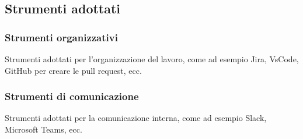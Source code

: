 \subsection{Strumenti adottati}
\label{sez:strumenti-adottati}

\subsubsection{Strumenti organizzativi}
\label{sez:strumenti-organizzativi}

Strumenti adottati per l'organizzazione del lavoro, come ad esempio Jira, VsCode, GitHub per creare le pull request, ecc.

\subsubsection{Strumenti di comunicazione}
\label{sez:strumenti-comunicazione}

Strumenti adottati per la comunicazione interna, come ad esempio Slack, Microsoft Teams, ecc.